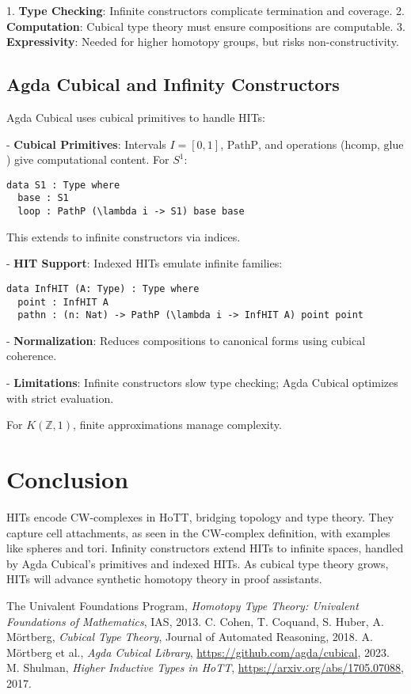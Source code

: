 \documentclass{article}
\theoremstyle{definition}
\begin{document}
1. \textbf{Type Checking}: Infinite constructors complicate
   termination and coverage.
2. \textbf{Computation}: Cubical type theory must ensure
   compositions are computable.
3. \textbf{Expressivity}: Needed for higher homotopy groups,
   but risks non-constructivity.

\subsection{Agda Cubical and Infinity Constructors}
Agda Cubical uses cubical primitives to handle HITs:

- \textbf{Cubical Primitives}: Intervals \( I = [0,1] \),
  \( \text{PathP} \), and operations (\( \text{hcomp} \),
  \( \text{glue} \)) give computational content. For \( S^1 \):
  \begin{lstlisting}
data S1 : Type where
  base : S1
  loop : PathP (\lambda i -> S1) base base
  \end{lstlisting}
  This extends to infinite constructors via indices.

- \textbf{HIT Support}: Indexed HITs emulate infinite families:
  \begin{lstlisting}
data InfHIT (A: Type) : Type where
  point : InfHIT A
  pathn : (n: Nat) -> PathP (\lambda i -> InfHIT A) point point
  \end{lstlisting}

- \textbf{Normalization}: Reduces compositions to canonical
  forms using cubical coherence.

- \textbf{Limitations}: Infinite constructors slow type
  checking; Agda Cubical optimizes with strict evaluation.

For \( K(\mathbb{Z}, 1) \), finite approximations manage
complexity.

\section{Conclusion}
HITs encode CW-complexes in HoTT, bridging topology and type
theory. They capture cell attachments, as seen in the
CW-complex definition, with examples like spheres and tori.
Infinity constructors extend HITs to infinite spaces, handled
by Agda Cubical’s primitives and indexed HITs. As cubical type
theory grows, HITs will advance synthetic homotopy theory in
proof assistants.


\begin{thebibliography}{9}
The Univalent Foundations Program, \emph{Homotopy Type Theory:
Univalent Foundations of Mathematics}, IAS, 2013.
C. Cohen, T. Coquand, S. Huber, A. Mörtberg, \emph{Cubical
Type Theory}, Journal of Automated Reasoning, 2018.
A. Mörtberg et al., \emph{Agda Cubical Library},
\url{https://github.com/agda/cubical}, 2023.
M. Shulman, \emph{Higher Inductive Types in HoTT},
\url{https://arxiv.org/abs/1705.07088}, 2017.
\end{thebibliography}
\end{document}
